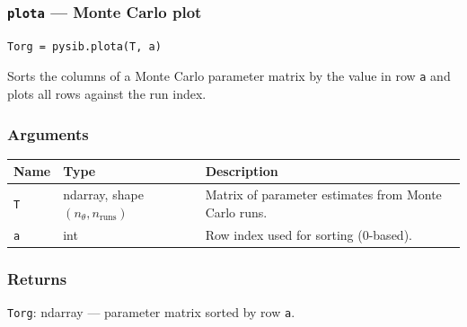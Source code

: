 \documentclass[../main]{subfiles}
\begin{document}
\newpage

\subsubsection{\texttt{plota} --- Monte Carlo plot}

\begin{lstlisting}
Torg = pysib.plota(T, a)
\end{lstlisting}

Sorts the columns of a Monte Carlo parameter matrix by the value in
row \texttt{a} and plots all rows against the run index.

\subsubsection*{Arguments}
\begin{center}
\begin{tabular}{lll}
  \toprule
  Name & Type & Description \\
  \midrule
  \texttt{T} & ndarray, shape $(n_\theta, n_\text{runs})$
             & Matrix of parameter estimates from Monte Carlo runs. \\
  \texttt{a} & int & Row index used for sorting (0-based). \\
  \bottomrule
\end{tabular}
\end{center}

\subsubsection*{Returns}
\texttt{Torg}: ndarray --- parameter matrix sorted by row \texttt{a}.
\end{document}
